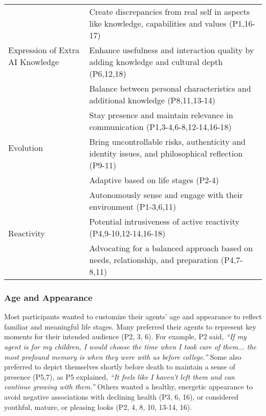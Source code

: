 \begin{table*}[htbp]
\begin{tabular}{p{}p{}}
    \hline
    \multirow{3}{=}{Expression of Extra AI Knowledge} 
            & Create discrepancies from real self in aspects like knowledge, capabilities and values (P1,16-17) \\ %
             & \cellcolor{gray!15}Enhance usefulness and interaction quality by adding knowledge and cultural depth (P6,12,18)  \\ %
             & Balance between personal characteristics and additional knowledge (P8,11,13-14) \\
    \hline
    \multirow{3}{=}{Evolution} 
            & \cellcolor{gray!15}Stay presence and maintain relevance in communication (P1,3-4,6-8,12-14,16-18) \\ %
             & Bring uncontrollable risks, authenticity and identity issues, and philosophical reflection (P9-11) \\ %
             & \cellcolor{gray!15}Adaptive based on life stages (P2-4) \\
    \hline
    \multirow{3}{=}{Reactivity} 
            & Autonomously sense and engage with their environment (P1-3,6,11) \\ %
             & \cellcolor{gray!15}Potential intrusiveness of active reactivity (P4,9-10,12-14,16-18) \\ %
             & Advocating for a balanced approach based on needs, relationship, and preparation (P4,7-8,11) \\
    \bottomrule
  \end{tabular}
\end{table*}

\subsubsection{Age and Appearance} \label{age and appearance}
Most participants wanted to customize their agents' age and appearance to reflect familiar and meaningful life stages. Many preferred their agents to represent key moments for their intended audience (P2, 3, 6). For example, P2 said, \textit{``If my agent is for my children, I would choose the time when I took care of them... the most profound memory is when they were with us before college.''} Some also preferred to depict themselves shortly before death to maintain a sense of presence (P5,7), as P5 explained, \textit{``It feels like I haven't left them and can continue growing with them.''} Others wanted a healthy, energetic appearance to avoid negative associations with declining health (P3, 6, 16), or considered youthful, mature, or pleasing looks (P2, 4, 8, 10, 13-14, 16).

